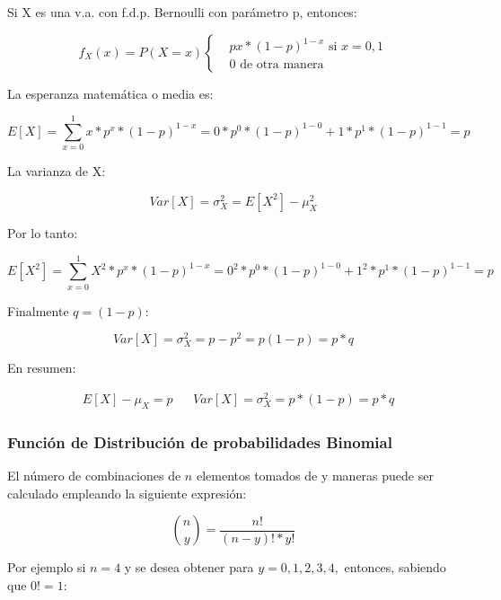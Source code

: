 Si X es una v.a. con f.d.p. Bernoulli con parámetro p, entonces:

\begin{equation}
    f_X(x)=P(X= x)
    \begin{cases}
         & px*(1-p)^{1-x}\text{ si } x=0,1 \\
         & 0\text{ de otra manera}
    \end{cases}
\end{equation}

La esperanza matemática o media es:

\begin{equation}
    E[X]=\sum_{x=0}^1x*p^x*(1-p)^{1-x}=0*p^0*(1-p)^{1-0}+1*p^1*(1-p)^{1-1}=p
\end{equation}

La varianza de X:

\begin{equation}
    Var[X]=\sigma_X^2 =E[X^2]-\mu_X^2
\end{equation}

Por lo tanto:

\begin{equation*}
    E[X^2]=\sum_{x=0}^1 X^2*p^x*(1-p)^{1-x}=0^2*p^0*(1-p)^{1-0}+1^2*p^1*(1-p )^{1-1}=p
\end{equation*}

Finalmente $q=(1-p)$:

\begin{equation}
    Var[X]=\sigma_X^2 =p-p^2=p(1-p) =p*q
\end{equation}

En resumen:

\begin{align*}
     & E[X]-\mu_X=p &  & Var[X]=\sigma_X^2=p*(1-p)=p*q
\end{align*}

\subsubsection{Función de Distribución de probabilidades Binomial}

El número de combinaciones de $n$ elementos tomados de y maneras puede ser
calculado empleando la siguiente expresión:

\begin{equation}
    \binom{n}{y}=\frac{n!}{(n-y ) !*y!}
\end{equation}

Por ejemplo si $n=4$ y se desea obtener para $y=0,1,2,3,4,$ entonces, sabiendo que $0!=1$:

